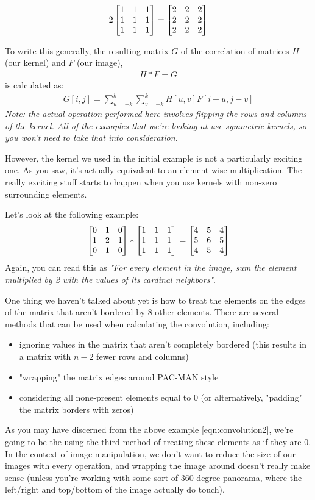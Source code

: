 \documentclass{tufte-handout}
\begin{document}
\begin{align}
    2 \begin{bmatrix} 1 & 1 & 1 \\ 1 & 1 & 1 \\ 1 & 1 & 1 \end{bmatrix} = \begin{bmatrix} 2 & 2 & 2 \\ 2 & 2 & 2 \\ 2 & 2 & 2 \end{bmatrix}
\end{align}

To write this generally, the resulting matrix $G$ of the correlation of matrices $H$ (our kernel) and $F$ (our image),
\begin{align}
    H * F = G
\end{align}
is calculated as:
\begin{align}
    G[i, j] = \sum_{u=-k}^{k} \sum_{v=-k}^{k} H[u, v] F[i - u, j - v]
\end{align}
\emph{Note: the actual operation performed here involves flipping the rows and columns of the kernel. All of the examples that we're looking at use symmetric kernels, so you won't need to take that into consideration.}

However, the kernel we used in the initial example is not a particularly exciting one. As you saw, it's actually equivalent to an element-wise multiplication. The really exciting stuff starts to happen when you use kernels with non-zero surrounding elements.

Let's look at the following example:
\begin{align}\label{eqn:convolution2}
    \begin{bmatrix} 0 & 1 & 0 \\ 1 & 2 & 1 \\ 0 & 1 & 0 \end{bmatrix} * \begin{bmatrix} 1 & 1 & 1 \\ 1 & 1 & 1 \\ 1 & 1 & 1 \end{bmatrix} =
    \begin{bmatrix} 4 & 5 & 4 \\ 5 & 6 & 5 \\ 4 & 5 & 4 \end{bmatrix}
\end{align}
Again, you can read this as \emph{"For every element in the image, sum the element multiplied by 2 with the values of its cardinal neighbors"}.

One thing we haven't talked about yet is how to treat the elements on the edges of the matrix that aren't bordered by 8 other elements. There are several methods that can be used when calculating the convolution, including:
\begin{itemize}
    \item ignoring values in the matrix that aren't completely bordered (this results in a matrix with $n-2$ fewer rows and columns)
    \item "wrapping" the matrix edges around PAC-MAN style
    \item considering all none-present elements equal to 0 (or alternatively, "padding" the matrix borders with zeros)
\end{itemize}
As you may have discerned from the above example \eqref{eqn:convolution2}, we're going to be the using the third method of treating these elements as if they are 0. In the context of image manipulation, we don't want to reduce the size of our images with every operation, and wrapping the image around doesn't really make sense (unless you're working with some sort of 360-degree panorama, where the left/right and top/bottom of the image actually do touch).
\end{document}
